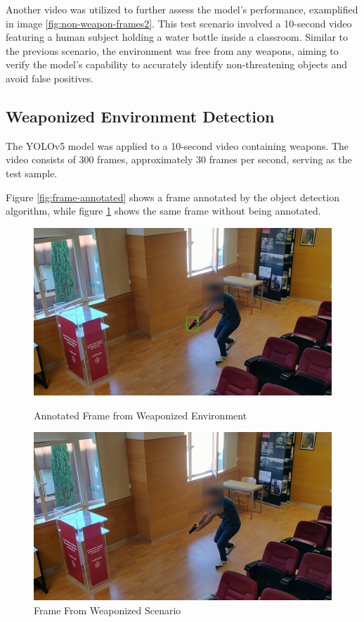 Another video was utilized to further assess the model's performance, examplified in image \ref{fig:non-weapon-frames2}. This test scenario involved a 10-second 
video featuring a human subject holding a water bottle inside a classroom. Similar to the previous scenario, 
the environment was free from any weapons, aiming to verify the model's capability to accurately identify 
non-threatening objects and avoid false positives.

\subsection{Weaponized Environment Detection}
The YOLOv5 model was applied to a 10-second video containing weapons. The video consists of 300 frames, 
approximately 30 frames per second, serving as the test sample.

Figure \ref{fig:frame-annotated} shows a frame annotated by the object detection algorithm, while figure 
\ref{fig:frame-47} shows the same frame without being annotated.

\begin{figure}[h]
    \centering
    \begin{minipage}{0.45\textwidth}
        \centering
        \includegraphics[width=1\linewidth]{figs/annotated_frame_160.jpg}
        \caption{Annotated Frame from Weaponized Environment}
        \label{fig:frame-annotated}
    \end{minipage}\hfill
    \begin{minipage}{0.45\textwidth}
        \centering
        \includegraphics[width=1\linewidth]{figs/frame_160.jpg}
        \caption{Frame From Weaponized Scenario}
        \label{fig:frame-47}
    \end{minipage}
\end{figure}

